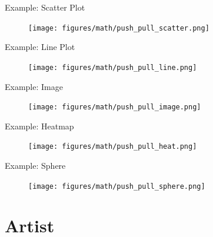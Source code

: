 \documentclass[xcolor={dvipsnames}, handout]{beamer}
\begin{document}
\begin{frame}{Example: Scatter Plot}
    \begin{figure}
        \texttt{[image: figures/math/push\_pull\_scatter.png]}
    \end{figure}
\end{frame}

\begin{frame}{Example: Line Plot}
    \begin{figure}
        \texttt{[image: figures/math/push\_pull\_line.png]}
    \end{figure}
\end{frame}

\begin{frame}{Example: Image}
    \begin{figure}
        \texttt{[image: figures/math/push\_pull\_image.png]}
    \end{figure}
\end{frame}

\begin{frame}{Example: Heatmap}
    \begin{figure}
        \texttt{[image: figures/math/push\_pull\_heat.png]}
    \end{figure}
\end{frame}

\begin{frame}{Example: Sphere}
    \begin{figure}
        \texttt{[image: figures/math/push\_pull\_sphere.png]}
    \end{figure}
\end{frame}

\section{Artist}
\end{document}
